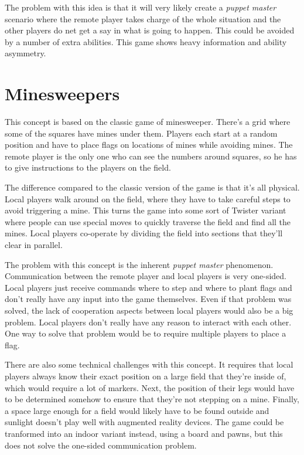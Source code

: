 	The problem with this idea is that it will very likely create a
	\emph{puppet master} scenario where the remote player takes charge
	of the whole situation and the other players do net get a
	say in what is going to happen. This could be avoided by a
	number of extra abilities. This game shows heavy
	information and ability asymmetry.

\section{Minesweepers}
	This concept is based on the classic game of minesweeper. There's a grid
	where some of the squares have mines under them. Players each start at a
	random position and have to place flags on locations of mines while avoiding
	mines. The remote player is the only one who can see the numbers around
	squares, so he has to give instructions to the players on the field.

	The difference compared to the classic version of the game is that it's all
	physical. Local players walk around on the field, where they have to take
	careful steps to avoid triggering a mine. This turns the game into some sort
	of Twister variant where people can use special moves to quickly traverse
	the field and find all the mines. Local players co-operate by dividing the
	field into sections that they'll clear in parallel.

	The problem with this concept is the inherent \emph{puppet master} phenomenon.
	Communication between the remote player and local players is very one-sided.
	Local players just receive commands where to step and where to plant flags
	and don't really have any input into the game themselves. Even if that
	problem was solved, the lack of cooperation aspects between local players
	would also be a big problem. Local players don't really have any reason to
	interact with each other. One way to solve that problem would be to require
	multiple players to place a flag.

	There are also some technical challenges with this concept. It requires that
	local players always know their exact position on a large field that they're
	inside of, which would require a lot of markers. Next, the position of their
	legs would have to be determined somehow to ensure that they're not stepping
	on a mine. Finally, a space large enough for a field would likely have to be
	found outside and sunlight doesn't play well with augmented reality devices.
	The game could be tranformed into an indoor variant instead, using a board
	and pawns, but this does not solve the one-sided communication problem.

